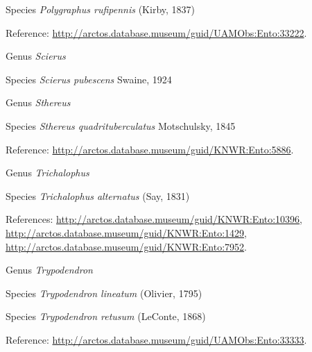 \documentclass[9pt, article]{memoir}
\begin{document}
\begin{multicols}{2}
\vspace{6pt}\noindent\hspace{36pt}Species \textit{Polygraphus rufipennis} (Kirby, 1837)


\vspace{6pt}Reference: 
\url{http://arctos.database.museum/guid/UAMObs:Ento:33222}.

\vspace{6pt}\noindent\hspace{30pt}Genus \textit{Scierus}


\vspace{6pt}\noindent\hspace{36pt}Species \textit{Scierus pubescens} Swaine, 1924


\vspace{6pt}\noindent\hspace{30pt}Genus \textit{Sthereus}


\vspace{6pt}\noindent\hspace{36pt}Species \textit{Sthereus quadrituberculatus} Motschulsky, 1845


\vspace{6pt}Reference: 
\url{http://arctos.database.museum/guid/KNWR:Ento:5886}.

\vspace{6pt}\noindent\hspace{30pt}Genus \textit{Trichalophus}


\vspace{6pt}\noindent\hspace{36pt}Species \textit{Trichalophus alternatus} (Say, 1831)


\vspace{6pt}References: 
\url{http://arctos.database.museum/guid/KNWR:Ento:10396}, 
\url{http://arctos.database.museum/guid/KNWR:Ento:1429}, 
\url{http://arctos.database.museum/guid/KNWR:Ento:7952}.

\vspace{6pt}\noindent\hspace{30pt}Genus \textit{Trypodendron}


\vspace{6pt}\noindent\hspace{36pt}Species \textit{Trypodendron lineatum} (Olivier, 1795)


\vspace{6pt}\noindent\hspace{36pt}Species \textit{Trypodendron retusum} (LeConte, 1868)


\vspace{6pt}Reference: 
\url{http://arctos.database.museum/guid/UAMObs:Ento:33333}.


\end{multicols}
\end{document}
